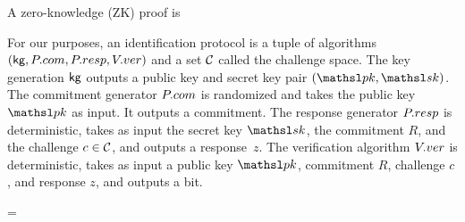 A zero-knowledge (ZK) proof is 

For our purposes, an identification protocol is a tuple of algorithms
$(\textsf{kg},P.com,P.resp,V.ver)$ and a set ${\cal C}$ called the challenge space. 
The key generation $\textsf{kg}$ outputs a public key and secret key pair
$(\pk,\sk)$. The commitment generator $P.com$ is randomized and takes the
public key $\pk$ as input. It outputs a commitment. The response generator $P.resp$ is
deterministic, takes as input the secret key $\sk$, the commitment $R$, and the
challenge $c \in {\cal C}$, and outputs a response~$z$. The verification
algorithm $V.ver$ is deterministic, takes as input a public key $\pk$, 
commitment $R$, challenge $c$, and response $z$, and outputs a bit.  

\bnm
{} = 
\enm



